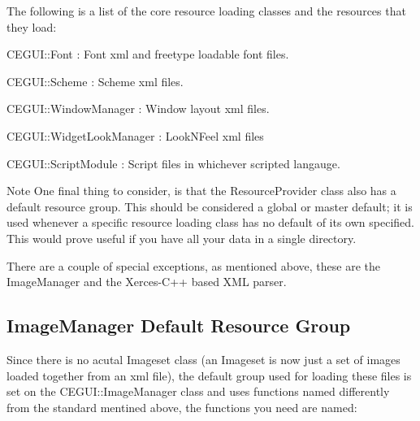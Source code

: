 The following is a list of the core resource loading classes and the resources that they load\+:
\begin{DoxyItemize}
\item {\ttfamily C\+E\+G\+U\+I\+::\+Font} \+: Font xml and freetype loadable font files.
\item {\ttfamily C\+E\+G\+U\+I\+::\+Scheme} \+: Scheme xml files.
\item {\ttfamily C\+E\+G\+U\+I\+::\+Window\+Manager} \+: Window layout xml files.
\item {\ttfamily C\+E\+G\+U\+I\+::\+Widget\+Look\+Manager} \+: Look\+N\+Feel xml files
\item {\ttfamily C\+E\+G\+U\+I\+::\+Script\+Module} \+: Script files in whichever scripted langauge.
\end{DoxyItemize}

\begin{DoxyNote}{Note}
One final thing to consider, is that the Resource\+Provider class also has a default resource group. This should be considered a global or master default; it is used whenever a specific resource loading class has no default of it\textquotesingle{}s own specified. This would prove useful if you have all your data in a single directory.
\end{DoxyNote}
There are a couple of special exceptions, as mentioned above, these are the Image\+Manager and the Xerces-\/\+C++ based X\+ML parser.\hypertarget{resprov_tutorial_resprov_tutorial_default_resource_groups_im}{}\subsection{Image\+Manager Default Resource Group}\label{resprov_tutorial_resprov_tutorial_default_resource_groups_im}
Since there is no acutal Imageset class (an Imageset is now just a set of images loaded together from an xml file), the default group used for loading these files is set on the C\+E\+G\+U\+I\+::\+Image\+Manager class and uses functions named differently from the \textquotesingle{}standard\textquotesingle{} mentined above, the functions you need are named\+: 
\begin{DoxyCode}{0}
\end{DoxyCode}


